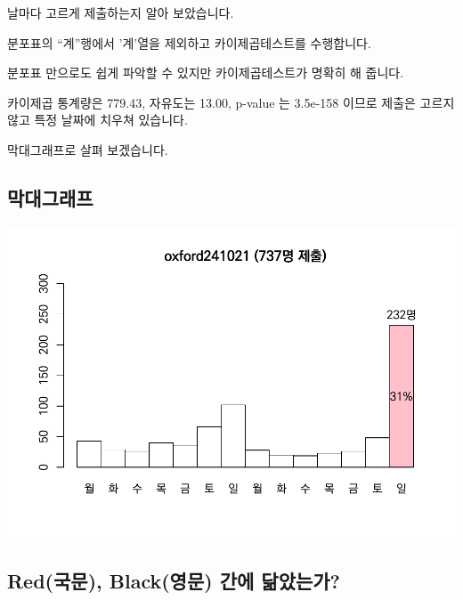 \documentclass[
]{book}
\begin{document}
날마다 고르게 제출하는지 알아 보았습니다.

분포표의 ``계''행에서 '계'열을 제외하고 카이제곱테스트를 수행합니다.

분포표 만으로도 쉽게 파악할 수 있지만 카이제곱테스트가 명확히 해 줍니다.

카이제곱 통계량은 779.43, 자유도는 13.00, p-value 는 3.5e-158 이므로 제출은 고르지 않고 특정 날짜에 치우쳐 있습니다.

막대그래프로 살펴 보겠습니다.

\subsection{막대그래프}\label{uxb9c9uxb300uxadf8uxb798uxd504-9}

\includegraphics{Quiz_report_2025_files/figure-latex/unnamed-chunk-247-1.pdf}

\subsection{Red(국문), Black(영문) 간에 닮았는가?}\label{reduxad6duxbb38-blackuxc601uxbb38-uxac04uxc5d0-uxb2eeuxc558uxb294uxac00}
\end{document}
